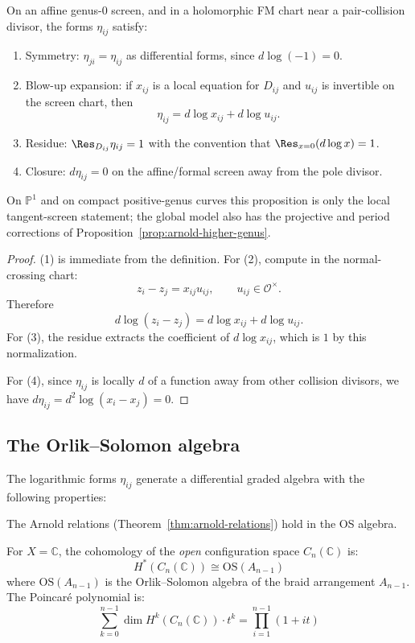\begin{proposition}\label{prop:eta}
On an affine genus-$0$ screen, and in a holomorphic FM chart near a
pair-collision divisor, the forms $\eta_{ij}$ satisfy:
\begin{enumerate}
\item Symmetry: $\eta_{ji} = \eta_{ij}$ as differential forms, since
$d\log(-1)=0$.
\item Blow-up expansion: if $x_{ij}$ is a local equation for $D_{ij}$
and $u_{ij}$ is invertible on the screen chart, then
\[
\eta_{ij}=d\log x_{ij}+d\log u_{ij}.
\]
\item Residue: $\Res_{D_{ij}}\eta_{ij}=1$ with the convention that
$\Res_{x=0}(d\log x)=1$.
\item Closure: $d\eta_{ij}=0$ on the affine/formal screen away from
the pole divisor.
\end{enumerate}
On $\mathbb P^1$ and on compact positive-genus curves this proposition
is only the local tangent-screen statement; the global model also has
the projective and period corrections of
Proposition~\ref{prop:arnold-higher-genus}.
\end{proposition}

\begin{proof}
(1) is immediate from the definition. For (2), compute in the
normal-crossing chart:
\[
z_i-z_j=x_{ij}u_{ij},
\qquad u_{ij}\in\mathcal O^\times .
\]
Therefore
\[
d\log(z_i-z_j)=d\log x_{ij}+d\log u_{ij}.
\]
For (3), the residue extracts the coefficient of $d\log x_{ij}$, which
is $1$ by this normalization.

For (4), since $\eta_{ij}$ is locally $d$ of a function away from other collision divisors, we have $d\eta_{ij} = d^2\log(x_i - x_j) = 0$.
\end{proof}

\subsection{The Orlik--Solomon algebra}

The logarithmic forms $\eta_{ij}$ generate a differential graded algebra with the following properties:

The Arnold relations (Theorem~\ref{thm:arnold-relations}) hold in the OS algebra.

\begin{theorem}\label{thm:os-cohomology-config}
For $X = \mathbb{C}$, the cohomology of the \emph{open} configuration space $C_n(\mathbb{C})$ is:
\[
H^*(C_n(\mathbb{C})) \cong \text{OS}(A_{n-1})
\]
where $\text{OS}(A_{n-1})$ is the Orlik--Solomon algebra of the braid arrangement $A_{n-1}$. The Poincar\'e polynomial is:
\[
\sum_{k=0}^{n-1} \dim H^k(C_n(\mathbb{C})) \cdot t^k = \prod_{i=1}^{n-1}(1 + it)
\]
\end{theorem}

